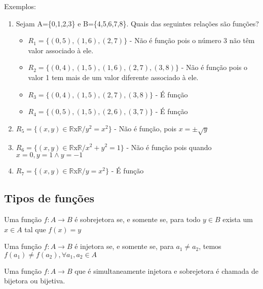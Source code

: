 Exemplos:
\begin{enumerate}
\item Sejam A=\{0,1,2,3\} e B=\{4,5,6,7,8\}. Quais das seguintes rela{\c c}{\~o}es s{\~a}o fun{\c c}{\~o}es?
\begin{itemize}
\item $R_{1}=\{(0,5),(1,6),(2,7)\}$ - N{\~a}o {\'e} fun{\c c}{\~a}o pois o n{\'u}mero 3 n{\~a}o t{\^e}m valor associado {\`a} ele.
\item $R_{2}=\{(0,4),(1,5),(1,6),(2,7),(3,8)\}$ - N{\~a}o {\'e} fun{\c c}{\~a}o pois o valor 1 tem mais de um valor diferente associado {\`a} ele.
\item $R_{3}=\{(0,4),(1,5),(2,7),(3,8)\}$ - {\'E} fun{\c c}{\~a}o
\item $R_{4}=\{(0,5),(1,5),(2,6),(3,7)\}$ - {\'E} fun{\c c}{\~a}o

\end{itemize}
\item $R_{5}=\{(x,y)\in\mathbb{R}$x$\mathbb{R}/y^{2}=x^{2}\}$ - N{\~a}o {\'e} fun{\c c}{\~a}o, pois $x=\pm \sqrt{y}$
\item $R_{6}=\{(x,y)\in\mathbb{R}$x$\mathbb{R}/x^{2}+y^{2}=1\}$ - N{\~a}o {\'e} fun{\c c}{\~a}o pois quando\\ $x=0,y=1\wedge y=-1$
\item  $R_{7}=\{(x,y)\in\mathbb{R}$x$\mathbb{R}/y=x^{2}\}$ - {\'E} fun{\c c}{\~a}o
\end{enumerate}

\subsection{Tipos de fun{\c c}{\~o}es}

\begin{definicao}  Uma fun{\c c}{\~a}o $f:A\rightarrow B$ {\'e} sobrejetora se, e somente se, para todo $y\in B$ exista um $x\in A$ tal que $f(x)=y$\end{definicao}

\begin{definicao} Uma fun{\c c}{\~a}o $f:A\rightarrow B$ {\'e} injetora se, e somente se, para $a_{1}\neq a_{2}$, temos $f(a_{1})\neq f(a_{2}), \forall a_{1},a_{2}\in A$\end{definicao}

\begin{definicao} Uma fun{\c c}{\~a}o $f:A\rightarrow B$ que {\'e} simultaneamente injetora e sobrejetora {\'e} chamada de bijetora ou bijetiva.
\end{definicao}


